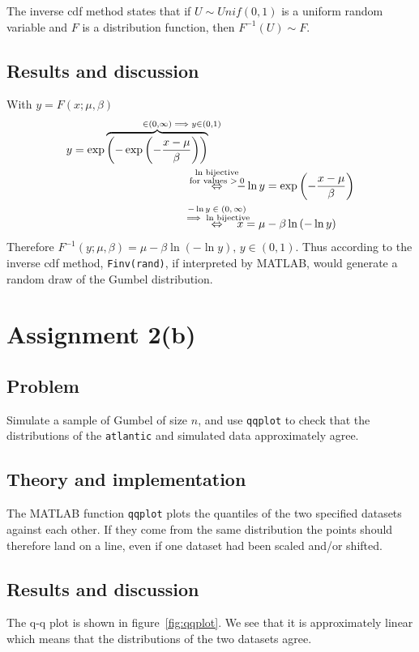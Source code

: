 \documentclass[11pt, a4paper]{article}
\begin{document}
The inverse cdf method states that if $U \sim Unif(0, 1)$ is a uniform random variable
and $F$ is a distribution function, then $F^{-1}(U) \sim F$.
\subsection{Results and discussion}
With $y=F(x; \mu, \beta)$
\begin{equation}
	\begin{split}
		y = \exp\overbrace{\left(-\exp\left(-\frac{x-\mu}{\beta}\right)\right)}^{\in \left(0, \infty\right) \mathrlap{\implies y \in \left(0, 1\right)}} &\\
		&\overset{\mathclap{\substack{\text{$\ln$ bijective} \\ \text{for values $>0$}}}}\Leftrightarrow \quad -\ln y = \exp\left(-\frac{x-\mu}{\beta}\right) \\
		&\overset{\mathclap{\substack{\text{$-\ln y \in \left(0, \infty\right)$} \\ \text{$\implies \ln$ bijective}}}}\Leftrightarrow \quad x = \mu - \beta \ln \left(-\ln y\right)
	\end{split}
\end{equation}
Therefore $F^{-1}(y; \mu, \beta) = \mu - \beta \ln \left(-\ln y\right), \, y \in (0, 1)$.
Thus according to the inverse cdf method, \verb|Finv(rand)|, if interpreted by MATLAB,
would generate a random draw of the Gumbel distribution.

\section{Assignment 2(b)}
\subsection{Problem}
Simulate a sample of Gumbel of size $n$,
and use \texttt{qqplot} to check that the distributions of the \texttt{atlantic} and simulated data
approximately agree.
\subsection{Theory and implementation}
The MATLAB function \texttt{qqplot} plots the quantiles of the two specified datasets
against each other.
If they come from the same distribution the points should therefore land on a line,
even if one dataset had been scaled and/or shifted.
\subsection{Results and discussion}
The q-q plot is shown in figure~\ref{fig:qqplot}.
We see that it is approximately linear which means that the distributions
of the two datasets agree.
\end{document}
